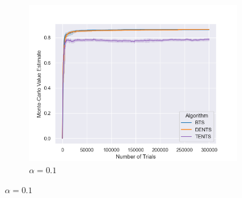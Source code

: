 \begin{figure}
\begin{subfigure}[b]{0.32\textwidth}
                \end{subfigure}
                \begin{subfigure}[b]{0.32\textwidth}
                    \centering
                    \includegraphics[width=\textwidth]{figures/temp/fl_sens/055_fl8_0_1_03.png}
                    \caption{$\alpha=0.1$}
                \end{subfigure}
                

\end{figure}
